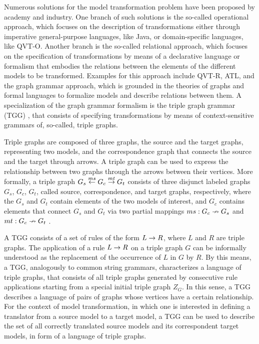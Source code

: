 Numerous solutions for the model transformation problem have been proposed by academy and industry. One branch of such solutions is the so-called operational approach, which focuses on the description of transformations either through imperative general-purpose languages, like Java, or domain-specific languages, like QVT-O. Another branch is the so-called relational approach, which focuses on the specification of transformations by means of a declarative language or formalism that embodies the relations between the elements of the different models to be transformed. Examples for this approach include QVT-R, ATL, and the graph grammar approach, which is grounded in the theories of graphs and formal languages to formalize models and describe relations between them. A specialization of the graph grammar formalism is the triple graph grammar (TGG) \cite{schurr1994specification}, that consists of specifying transformations by means of context-sensitive grammars of, so-called, triple graphs.

Triple graphs are composed of three graphs, the source and the target graphs, representing two models, and the correspondence graph that connects the source and the target through arrows. A triple graph can be used to express the relationship between two graphs through the arrows between their vertices. More formally, a triple graph $G_s \overset{ms}{\leftarrow} G_c \overset{mt}{\rightarrow} G_t$ consists of three disjunct labeled graphs $G_s$, $G_c$, $G_t$, called source, correspondence, and target graphs, respectively, where the $G_s$ and $G_t$ contain elements of the two models of interest, and $G_c$ contains elements that connect $G_s$ and $G_t$ via two partial mappings $ms: G_c \nrightarrow G_s$ and $mt: G_c \nrightarrow G_t$ \cite{schurr1994specification}.

A TGG consists of a set of rules of the form $L \to R$, where $L$ and $R$ are triple graphs. The application of a rule $L \to R$ on a triple graph $G$ can be informally understood as the replacement of the occurrence of $L$ in $G$ by $R$. By this means, a TGG, analogously to common string grammars, characterizes a language of triple graphs, that consists of all triple graphs generated by consecutive rule applications starting from a special initial triple graph $Z_G$. In this sense, a TGG describes a language of pairs of graphs whose vertices have a certain relationship. For the context of model transformation, in which one is interested in defining a translator from a source model to a target model, a TGG can be used to describe the set of all correctly translated source models and its correspondent target models, in form of a language of triple graphs.

